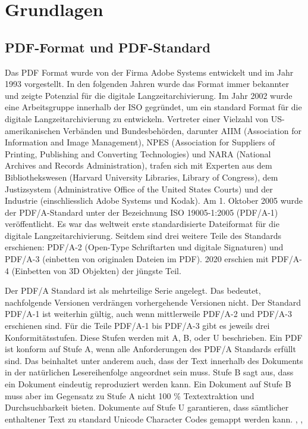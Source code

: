 \documentclass[a4paper,oneside, 12pt]{report}
\begin{document}
\chapter{Grundlagen}\label{sec:grundlagen}
\section{PDF-Format und PDF-Standard}
Das PDF Format wurde von der Firma Adobe Systems entwickelt und im Jahr 1993 vorgestellt. In den folgenden Jahren wurde das Format immer bekannter und zeigte Potenzial für die digitale Langzeitarchivierung. Im Jahr 2002 wurde eine Arbeitsgruppe innerhalb der \ac{ISO} gegründet, um ein standard Format für die digitale Langzeitarchivierung zu entwickeln. Vertreter einer Vielzahl von US-amerikanischen Verbänden und Bundesbehörden, darunter AIIM (Association for Information and Image Management), NPES (Association for Suppliers of Printing, Publishing and Converting Technologies) und NARA (National Archives and Records Administration), trafen sich mit Experten aus dem Bibliothekswesen (Harvard University Libraries, Library of Congress), dem Justizsystem (Administrative Office of the United States Courts) und der Industrie (einschliesslich Adobe Systems und Kodak). Am 1. Oktober 2005 wurde der PDF/A-Standard unter der Bezeichnung ISO 19005-1:2005 (PDF/A-1) veröffentlicht. Es war das weltweit erste standardisierte Dateiformat für die digitale Langzeitarchivierung. Seitdem sind drei weitere Teile des Standards erschienen: PDF/A-2 (Open-Type Schriftarten und digitale Signaturen) und PDF/A-3 (einbetten von originalen Dateien im PDF). 2020 erschien mit PDF/A-4 (Einbetten von 3D Objekten) der jüngste Teil. \cite{pdfhist}

Der PDF/A Standard ist als mehrteilige Serie angelegt. Das bedeutet, nachfolgende Versionen verdrängen vorhergehende Versionen nicht. Der Standard PDF/A-1 ist weiterhin gültig, auch wenn mittlerweile PDF/A-2 und PDF/A-3 erschienen sind. Für die Teile PDF/A-1 bis PDF/A-3 gibt es jeweils drei Konformitätsstufen. Diese Stufen werden mit A, B, oder U beschrieben. Ein PDF ist konform auf Stufe A, wenn alle Anforderungen des PDF/A Standards erfüllt sind. Das beinhaltet unter anderem auch, dass der Text innerhalb des Dokuments in der natürlichen Lesereihenfolge angeordnet sein muss. Stufe B sagt aus, dass ein Dokument eindeutig reproduziert werden kann. Ein Dokument auf Stufe B muss aber im Gegensatz zu Stufe A nicht 100 \% Textextraktion und Durchsuchbarkeit bieten. Dokumente auf Stufe U garantieren, dass sämtlicher enthaltener Text zu standard Unicode Character Codes gemappt werden kann. \cite{pdfhist}, \cite{pdftools}, \cite{adobepdf}
\end{document}
